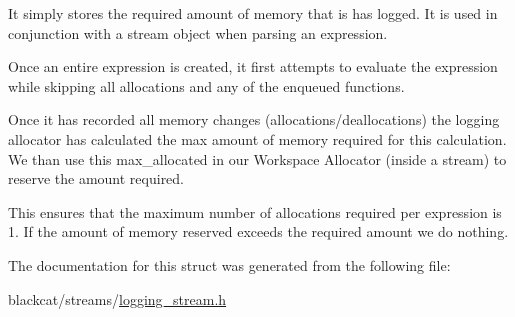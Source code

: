 It simply stores the required amount of memory that is has logged. It is used in conjunction with a stream object when parsing an expression.

Once an entire expression is created, it first attempts to evaluate the expression while skipping all allocations and any of the enqueued functions.

Once it has recorded all memory changes (allocations/deallocations) the logging allocator has calculated the max amount of memory required for this calculation. We than use this max\+\_\+allocated in our Workspace Allocator (inside a stream) to reserve the amount required.

This ensures that the maximum number of allocations required per expression is 1. If the amount of memory reserved exceeds the required amount we do nothing. 

The documentation for this struct was generated from the following file\+:\begin{DoxyCompactItemize}
\item 
blackcat/streams/\hyperlink{logging__stream_8h}{logging\+\_\+stream.\+h}\end{DoxyCompactItemize}
